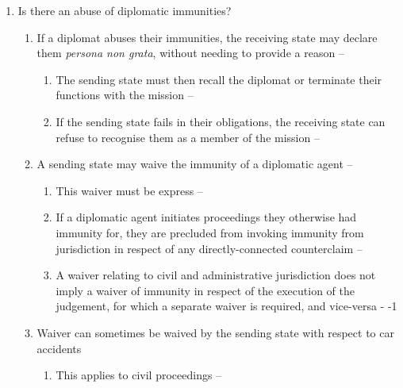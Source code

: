 \begin{enumerate}
\begin{enumerate}
\begin{enumerate}
        \end{enumerate}
        \item Is there an abuse of diplomatic immunities?
        \begin{enumerate}
            \item If a diplomat abuses their immunities, the receiving state may declare them \textit{persona non grata}, without needing to provide a reason -- 
            \begin{enumerate}
                \item The sending state must then recall the diplomat or terminate their functions with the mission -- 
                \item If the sending state fails in their obligations, the receiving state can refuse to recognise them as a member of the mission -- 
            \end{enumerate}
            \item A sending state may waive the immunity of a diplomatic agent -- 
            \begin{enumerate}
                \item This waiver must be express -- 
                \item If a diplomatic agent initiates proceedings they otherwise had immunity for, they are precluded from invoking immunity from jurisdiction in respect of any directly-connected counterclaim -- 
                \item A waiver relating to civil and administrative jurisdiction does not imply a waiver of immunity in respect of the execution of the judgement, for which a separate waiver is required, and vice-versa - -1
            \end{enumerate}
            \item Waiver can sometimes be waived by the sending state with respect to car accidents
            \begin{enumerate}
                \item This applies to civil proceedings -- 

\end{enumerate}
\end{enumerate}
\end{enumerate}
\end{enumerate}
